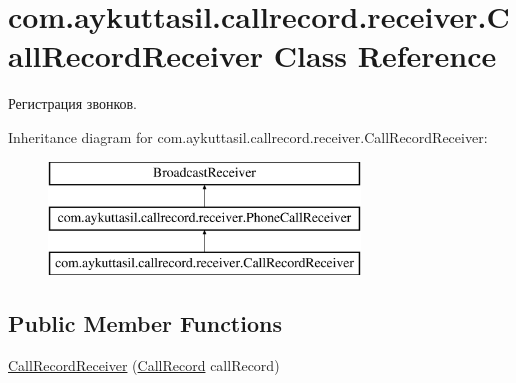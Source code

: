 \hypertarget{classcom_1_1aykuttasil_1_1callrecord_1_1receiver_1_1_call_record_receiver}{}\section{com.\+aykuttasil.\+callrecord.\+receiver.\+Call\+Record\+Receiver Class Reference}
\label{classcom_1_1aykuttasil_1_1callrecord_1_1receiver_1_1_call_record_receiver}


Регистрация звонков.  


Inheritance diagram for com.\+aykuttasil.\+callrecord.\+receiver.\+Call\+Record\+Receiver\+:\begin{figure}[H]
\begin{center}
\leavevmode
\includegraphics[height=3.000000cm]{classcom_1_1aykuttasil_1_1callrecord_1_1receiver_1_1_call_record_receiver}
\end{center}
\end{figure}
\subsection*{Public Member Functions}
\begin{DoxyCompactItemize}
\item 
\hyperlink{classcom_1_1aykuttasil_1_1callrecord_1_1receiver_1_1_call_record_receiver_a81b445370d447ac2e2594a33eac07437}{Call\+Record\+Receiver} (\hyperlink{classcom_1_1aykuttasil_1_1callrecord_1_1_call_record}{Call\+Record} call\+Record)
\end{DoxyCompactItemize}
